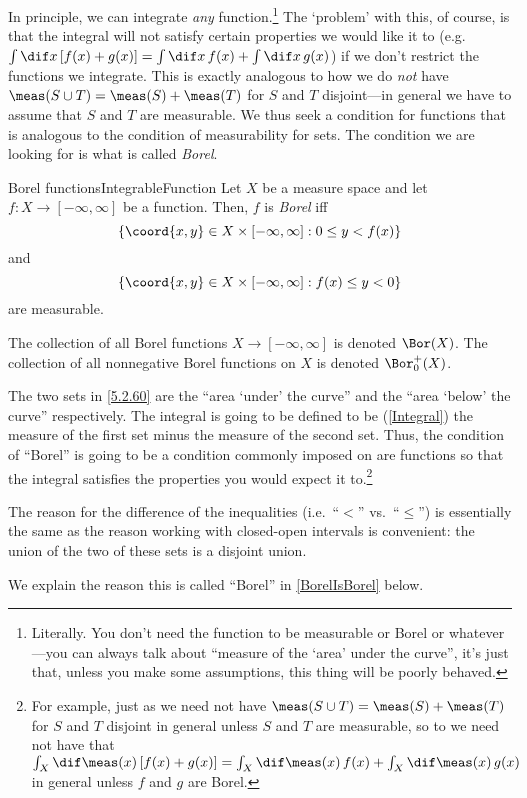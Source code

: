 In principle, we can integrate \emph{any} function.\footnote{Literally.  You don't need the function to be measurable or Borel or whatever---you can always talk about ``measure of the `area' under the curve'', it's just that, unless you make some assumptions, this thing will be poorly behaved.}  The `problem' with this, of course, is that the integral will not satisfy certain properties we would like it to (e.g.~$\int \dif x\, [f(x)+g(x)]=\int \dif x\, f(x)+\int \dif x\, g(x)$) if we don't restrict the functions we integrate.  This is exactly analogous to how we do \emph{not} have $\meas (S\cup T)=\meas (S)+\meas (T)$ for $S$ and $T$ disjoint---in general we have to assume that $S$ and $T$ are measurable.  We thus seek a condition for functions that is analogous to the condition of measurability for sets.  The condition we are looking for is what is called \emph{Borel}.
\begin{dfn}{Borel functions}{IntegrableFunction}
Let $X$ be a measure space and let $f\colon X\rightarrow [-\infty ,\infty ]$ be a function.  Then, $f$ is \emph{Borel} iff
\begin{equation}\label{5.2.60}
\{ \coord{x,y}\in X\times [-\infty ,\infty ]:0\leq y<f(x)\}
\end{equation}
and
\begin{equation}
\{ \coord{x,y}\in X\times [-\infty ,\infty ]:f(x)\leq y<0\}
\end{equation}
are measurable.
\begin{rmk}
The collection of all Borel functions $X\rightarrow [-\infty ,\infty]$ is denoted $\Bor (X)$.  The collection of all nonnegative Borel functions on $X$ is denoted $\Bor _0^+(X)$. 
\end{rmk}
\begin{rmk}
The two sets in \eqref{5.2.60} are the ``area `under' the curve'' and the ``area `below' the curve'' respectively.  The integral is going to be defined to be (\cref{Integral}) the measure of the first set minus the measure of the second set.  Thus, the condition of ``Borel'' is going to be a condition commonly imposed on are functions so that the integral satisfies the properties you would expect it to.\footnote{For example, just as we need not have $\meas (S\cup T)=\meas (S)+\meas (T)$ for $S$ and $T$ disjoint in general unless $S$ and $T$ are measurable, so to we need not have that $\int _X\dif \meas (x)\, [f(x)+g(x)]=\int _X\dif \meas (x)\, f(x)+\int _X\dif \meas (x)\, g(x)$ in general unless $f$ and $g$ are Borel.}
\end{rmk}
\begin{rmk}
The reason for the difference of the inequalities (i.e.\ ``$<$'' vs.\ ``$\leq $'') is essentially the same as the reason working with closed-open intervals is convenient:  the union of the two of these sets is a disjoint union.
\end{rmk}
\begin{rmk}
We explain the reason this is called ``Borel'' in \cref{BorelIsBorel} below.
\end{rmk}
\end{dfn}
